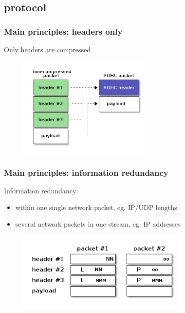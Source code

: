 \documentclass[utf8]{beamer}
\begin{document}
\subsection{protocol}
\begin{frame}
	\frametitle{Main principles: headers only}
	Only headers are compressed
	\begin{figure}
		\includegraphics[height=50mm]{images/rohc_only_headers_are_compressed.png}
	\end{figure}
\end{frame}
\begin{frame}
	\frametitle{Main principles: information redundancy}
	Information redundancy:
	\begin{itemize}
		\item within one single network packet, eg. IP/UDP lengths
		\item several network packets in one stream, eg. IP addresses
	\end{itemize}
	\begin{figure}
		\includegraphics[height=40mm]{images/rohc_redundancy.png}
	\end{figure}
\end{frame}
\end{document}
